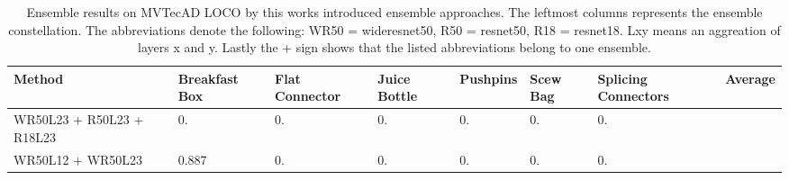 \begin{table}[htbp]
    \tiny
    \centering
    \begin{tabularx}{\textwidth}{|X|X|X|X|X|X|X|X|}%
        \hline
        \textbf{Method} & \textbf{Breakfast Box} & \textbf{Flat Connector} & \textbf{Juice Bottle} & \textbf{Pushpins} & \textbf{Scew Bag} & \textbf{Splicing Connectors} & \textbf{Average} \\
        \hline
        WR50L23 + R50L23 + R18L23  & 0. & 0. & 0. & 0. & 0. & 0. \\
        \hline
        WR50L12 + WR50L23 & 0.887 & 0. & 0. & 0. & 0. & 0. \\
        \hline
    \end{tabularx}
    \caption{Ensemble results on MVTecAD LOCO \cite{LOCODentsAndScratchesBergmann2022} by this works introduced ensemble approaches. The leftmost columns represents the ensemble 
             constellation. The abbreviations denote the following: 
             WR50 = wideresnet50, R50 = resnet50, R18 = resnet18. Lxy means an aggreation of layers x and y. Lastly the + sign shows that the listed abbreviations belong to one ensemble.}
    \label{tab:ensemblepixelAUROC}
\end{table}